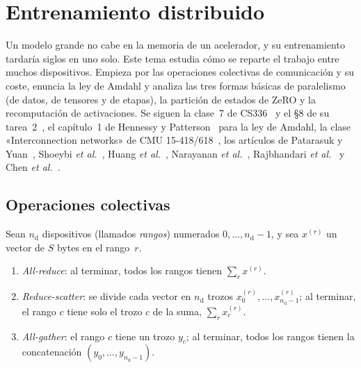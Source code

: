 \chapter{Entrenamiento distribuido}
\label{tema:5}

Un modelo grande no cabe en la memoria de un acelerador, y su entrenamiento tardaría siglos en uno solo. Este tema estudia cómo se reparte el trabajo entre muchos dispositivos. Empieza por las operaciones colectivas de comunicación y su coste, enuncia la ley de Amdahl y analiza las tres formas básicas de paralelismo (de datos, de tensores y de etapas), la partición de estados de ZeRO y la recomputación de activaciones. Se siguen la clase~7 de CS336~\cite{cs336} y el §8 de su tarea~2~\cite{cs336a2}, el capítulo~1 de Hennessy y Patterson~\cite{hp} para la ley de Amdahl, la clase «Interconnection networks» de CMU 15-418/618~\cite{cmu418}, los artículos de Patarasuk y Yuan~\cite{patarasuk}, Shoeybi \emph{et al.}~\cite[§3]{megatron}, Huang \emph{et al.}~\cite[§2.3]{gpipe}, Narayanan \emph{et al.}~\cite[§2--3]{narayanan}, Rajbhandari \emph{et al.}~\cite[§3--7]{zero} y Chen \emph{et al.}~\cite{chen-checkpoint}.

\section{Operaciones colectivas}

Sean $n_{\mathrm{d}}$ dispositivos (llamados \emph{rangos}) numerados $0,\dots,n_{\mathrm{d}}-1$, y sea $x^{(r)}$ un vector de $S$ bytes en el rango~$r$.

\begin{definicion}
\begin{enumerate}
  \item \emph{All-reduce}: al terminar, todos los rangos tienen $\sum_{r}x^{(r)}$.
  \item \emph{Reduce-scatter}: se divide cada vector en $n_{\mathrm{d}}$ trozos $x^{(r)}_0,\dots,x^{(r)}_{n_{\mathrm{d}}-1}$; al terminar, el rango $c$ tiene solo el trozo $c$ de la suma, $\sum_r x^{(r)}_c$.
  \item \emph{All-gather}: el rango $c$ tiene un trozo $y_c$; al terminar, todos los rangos tienen la concatenación $(y_0,\dots,y_{n_{\mathrm{d}}-1})$.
\end{enumerate}
\end{definicion}

